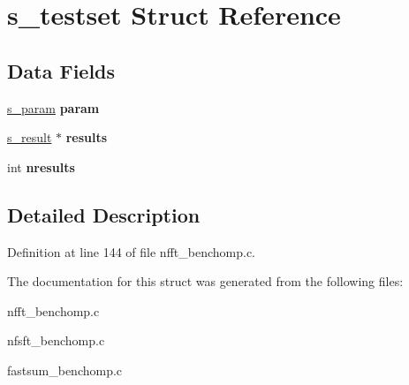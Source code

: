 \hypertarget{structs__testset}{\section{s\-\_\-testset Struct Reference}
\label{structs__testset}
}
\subsection*{Data Fields}
\begin{DoxyCompactItemize}
\item 
\hypertarget{structs__testset_abac38e41e682993ccec030f7862d86fa}{\hyperlink{structs__param}{s\-\_\-param} {\bfseries param}}\label{structs__testset_abac38e41e682993ccec030f7862d86fa}

\item 
\hypertarget{structs__testset_a519427a984ec85acc3cb3dc5f3a724be}{\hyperlink{structs__result}{s\-\_\-result} $\ast$ {\bfseries results}}\label{structs__testset_a519427a984ec85acc3cb3dc5f3a724be}

\item 
\hypertarget{structs__testset_a641e1f292f908995f7a1df9fe725e48b}{int {\bfseries nresults}}\label{structs__testset_a641e1f292f908995f7a1df9fe725e48b}

\end{DoxyCompactItemize}


\subsection{Detailed Description}


Definition at line 144 of file nfft\-\_\-benchomp.\-c.



The documentation for this struct was generated from the following files\-:\begin{DoxyCompactItemize}
\item 
nfft\-\_\-benchomp.\-c\item 
nfsft\-\_\-benchomp.\-c\item 
fastsum\-\_\-benchomp.\-c\end{DoxyCompactItemize}
